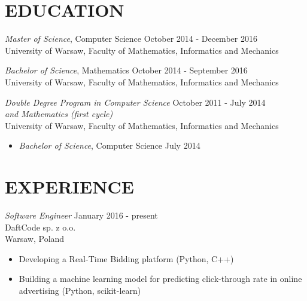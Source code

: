 \documentclass[margin, 10pt]{res} %
\begin{document}
\begin{resume}


\section{EDUCATION}

{\sl Master of Science}, Computer Science \hfill October 2014 - December 2016 \\
University of Warsaw, Faculty of Mathematics, Informatics and Mechanics

{\sl Bachelor of Science}, Mathematics \hfill October 2014 - September 2016\\
University of Warsaw, Faculty of Mathematics, Informatics and Mechanics

{\sl Double Degree Program in Computer Science} \hfill October 2011 - July 2014 \\ {\sl and Mathematics (first cycle)} \\
University of Warsaw, Faculty of Mathematics, Informatics and Mechanics
\begin{itemize}
\item {\sl Bachelor of Science}, Computer Science \hfill July 2014
\end{itemize}
 
\section{EXPERIENCE}

{\sl Software Engineer} \hfill January 2016 - present \\
DaftCode sp. z o.o. \\
Warsaw, Poland

\begin{itemize} \itemsep -2pt %
\item Developing a Real-Time Bidding platform (Python, C++)
\item Building a machine learning model for predicting click-through rate in online advertising (Python, scikit-learn)
\end{itemize}


\end{resume}
\end{document}
